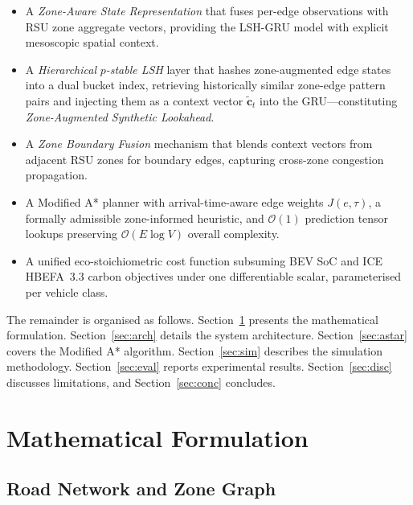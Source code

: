 \documentclass[journal,letterpaper,10pt]{IEEEtran}
\theoremstyle{definition}
\theoremstyle{remark}
\newcommand{\bigO}[1]{\mathcal{O}\!\left(#1\right)}
\begin{document}
\begin{itemize}
  \item[\textbf{C1.}] A \emph{Zone-Aware State Representation}
    that fuses per-edge observations with RSU zone aggregate vectors,
    providing the LSH-GRU model with explicit mesoscopic spatial
    context.

  \item[\textbf{C2.}] A \emph{Hierarchical} $p$\emph{-stable LSH}
    layer that hashes zone-augmented edge states into a dual bucket
    index, retrieving historically similar zone-edge pattern pairs
    and injecting them as a context vector $\tilde{\mathbf{c}}_{t}$
    into the GRU---constituting \emph{Zone-Augmented Synthetic
    Lookahead}.

  \item[\textbf{C3.}] A \emph{Zone Boundary Fusion} mechanism that
    blends context vectors from adjacent RSU zones for boundary edges,
    capturing cross-zone congestion propagation.

  \item[\textbf{C4.}] A Modified A* planner with arrival-time-aware
    edge weights $J(e,\tau)$, a formally admissible zone-informed
    heuristic, and $\bigO{1}$ prediction tensor lookups preserving
    $\bigO{E\log V}$ overall complexity.

  \item[\textbf{C5.}] A unified eco-stoichiometric cost function
    subsuming BEV SoC and ICE HBEFA~3.3 carbon objectives under one
    differentiable scalar, parameterised per vehicle class.
\end{itemize}

The remainder is organised as follows.
Section~\ref{sec:math} presents the mathematical formulation.
Section~\ref{sec:arch} details the system architecture.
Section~\ref{sec:astar} covers the Modified A* algorithm.
Section~\ref{sec:sim} describes the simulation methodology.
Section~\ref{sec:eval} reports experimental results.
Section~\ref{sec:disc} discusses limitations, and
Section~\ref{sec:conc} concludes.

\section{Mathematical Formulation}
\label{sec:math}

\subsection{Road Network and Zone Graph}
\end{document}
